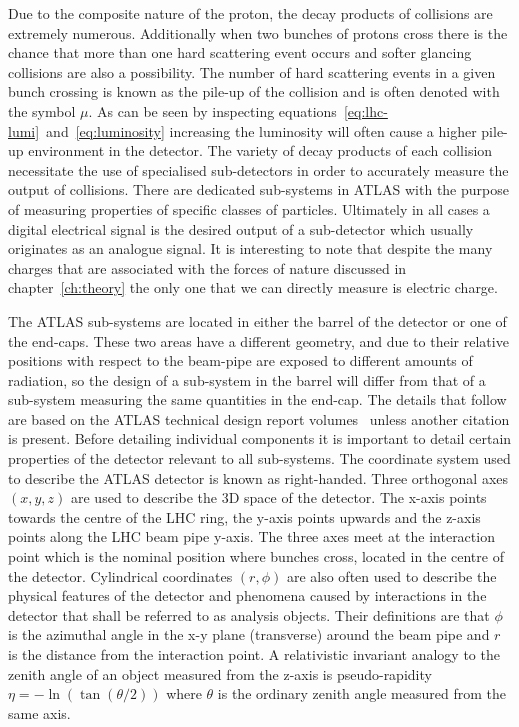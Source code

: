 Due to the composite nature of the proton, the decay products of collisions are
extremely numerous. Additionally when two bunches of protons cross there is the
chance that more than one hard scattering event occurs and softer glancing
collisions are also a possibility. The number of hard scattering events in a
given bunch crossing is known as the pile-up of the collision and is often
denoted with the symbol $\mu$. As can be seen by inspecting
equations~\ref{eq:lhc-lumi}~and~\ref{eq:luminosity} increasing the luminosity
will often cause a higher pile-up environment in the detector. The variety of
decay products of each collision necessitate the use of specialised
sub-detectors in order to accurately measure the output of collisions. There are
dedicated sub-systems in ATLAS with the purpose of measuring properties of
specific classes of particles. Ultimately in all cases a digital electrical
signal is the desired output of a sub-detector which usually originates as an
analogue signal. It is interesting to note that despite the many charges that
are associated with the forces of nature discussed in chapter~\ref{ch:theory}
the only one that we can directly measure is electric charge.

The ATLAS sub-systems are located in either the barrel of the detector or one of
the end-caps. These two areas have a different geometry, and due to their
relative positions with respect to the beam-pipe are exposed to different
amounts of radiation, so the design of a sub-system in the barrel will differ
from that of a sub-system measuring the same quantities in the end-cap. The
details that follow are based on the ATLAS technical design report
volumes~\cite{ATLAS-TDR-01, ATLAS-TDR-02} unless another citation is present.
Before detailing individual components it is important to detail certain
properties of the detector relevant to all sub-systems.  The coordinate system
used to describe the ATLAS detector is known as right-handed. Three orthogonal
axes $(x, y, z)$ are used to describe the 3D space of the detector. The x-axis
points towards the centre of the LHC ring, the y-axis points upwards and the
z-axis points along the LHC beam pipe y-axis. The three axes meet at the
interaction point which is the nominal position where bunches cross, located in
the centre of the detector. Cylindrical coordinates $(r, \phi)$ are also often
used to describe the physical features of the detector and phenomena caused by
interactions in the detector that shall be referred to as analysis objects.
Their definitions are that $\phi$ is the azimuthal angle in the x-y plane
(transverse) around the beam pipe and $r$ is the distance from the interaction
point. A relativistic invariant analogy to the zenith angle of an object
measured from the z-axis is pseudo-rapidity $\eta = - \ln(\tan(\theta / 2))$
where $\theta$ is the ordinary zenith angle measured from the same axis.

